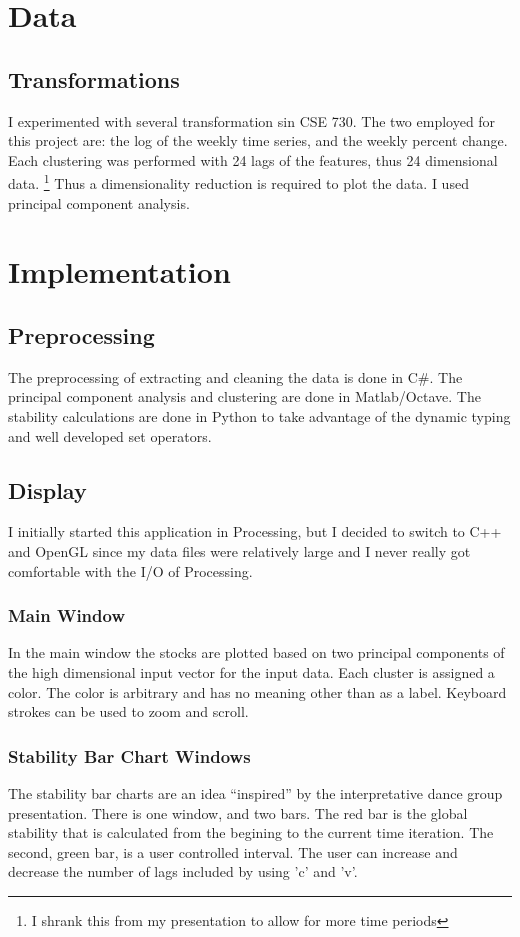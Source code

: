 \documentclass{article}
\begin{document}
\begin{multicols}{2}
\section{Data}
\subsection{Transformations}
I experimented with several transformation sin CSE 730.  The two employed for this project are: the log of the weekly time series, and the  weekly percent change.  Each clustering was performed with 24 lags of the features, thus 24 dimensional data. \footnote{I shrank this from my presentation to allow for more time periods}  Thus a dimensionality reduction is required to plot the data.  I used principal component analysis.
\section{Implementation}
\subsection{Preprocessing}
The preprocessing of extracting and cleaning the data is done in C\#.  The principal component analysis and clustering are done in Matlab/Octave.  The stability calculations are done in Python to take advantage of the dynamic typing and well developed set operators.
\subsection{Display}
I initially started this application in Processing, but I decided to switch to C++ and OpenGL since my data files were relatively large and I never really got comfortable with the I/O of Processing.
  
\subsubsection{Main Window}
In the main window the stocks are plotted based on two principal components of the high dimensional input vector for the input data.  Each cluster is assigned a color.  The color is arbitrary and has no meaning other than as a label.  Keyboard strokes can be used to zoom and scroll.

\subsubsection{Stability Bar Chart Windows}
The stability bar charts are an idea ``inspired'' by the interpretative dance group presentation.  There is one window, and two bars.  The red bar is the global stability that is calculated from the begining to the current time iteration.  The second, green bar, is a user controlled interval.  The user can increase and decrease the number of lags included by using 'c' and 'v'.


\end{multicols}
\end{document}
